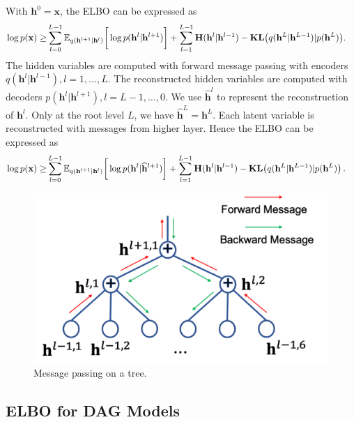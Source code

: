 \documentclass[twoside]{article}
\begin{document}
With $\mathbf{h}^0 = \mathbf{x}$,  the ELBO can be expressed as
\begin{align*}
\log p(\mathbf{x}) \geq &   \sum_{l=0}^{L-1}  \mathbb{E}_{q(\mathbf{h}^{l+1}|\mathbf{h}^l)} \bigg[ \log p( \mathbf{h}^{l}|  \mathbf{h}^{l+1})   \bigg] +  \sum_{l=1}^{L-1}   \textbf{\text{H}}(\mathbf{h}^l | \mathbf{h}^{l-1} ) -   \textbf{\text{KL}}\big(q(\mathbf{h}^L | \mathbf{h}^{L-1} )   | p(\mathbf{h}^L)  \big) . 
 \end{align*}
The hidden variables are computed with forward message passing with encoders $q(\mathbf{h}^l | \mathbf{h}^{l-1}), l = 1,\dots, L$. 
The reconstructed hidden variables are computed with decoders $p(\mathbf{h}^l | \mathbf{h}^{l+1}), l = L-1, \dots, 0$. 
We use $\widehat{\mathbf{h}}^l$ to represent the reconstruction of $\mathbf{h}^l$. 
Only at the root level $L$, we have $\widehat{\mathbf{h}}^L = \mathbf{h}^L$. 
Each latent variable is reconstructed with messages from higher layer. 
Hence the ELBO can be expressed as 
\begin{align*}
\log p(\mathbf{x}) \geq &   \sum_{l=0}^{L-1}  \mathbb{E}_{q(\mathbf{h}^{l+1}|\mathbf{h}^l)} \bigg[ \log p( \mathbf{h}^{l}|  \widehat{\mathbf{h}}^{l+1})   \bigg] +  \sum_{l=1}^{L-1}   \textbf{\text{H}}(\mathbf{h}^l | \mathbf{h}^{l-1} ) -   \textbf{\text{KL}}\big(q(\mathbf{h}^L | \mathbf{h}^{L-1} )   | p(\mathbf{h}^L)  \big) \, .
 \end{align*}


\begin{figure}[H]%
\begin{center}
 \includegraphics[width=0.5\linewidth]{fig/tree_message.png}
\end{center}
 \caption{Message passing on a tree.} \label{fig:message_tree}
\end{figure}


\subsection{ELBO for DAG Models}\label{appd:dag_elbo}
\end{document}
